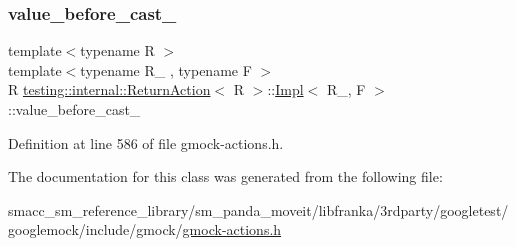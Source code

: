 \subsubsection{\texorpdfstring{value\+\_\+before\+\_\+cast\+\_\+}{value\_before\_cast\_}}
{\footnotesize\ttfamily template$<$typename R $>$ \\
template$<$typename R\+\_\+ , typename F $>$ \\
R \hyperlink{classtesting_1_1internal_1_1ReturnAction}{testing\+::internal\+::\+Return\+Action}$<$ R $>$\+::\hyperlink{classtesting_1_1internal_1_1ReturnAction_1_1Impl}{Impl}$<$ R\+\_\+, F $>$\+::value\+\_\+before\+\_\+cast\+\_\+\hspace{0.3cm}{\ttfamily [private]}}



Definition at line 586 of file gmock-\/actions.\+h.



The documentation for this class was generated from the following file\+:\begin{DoxyCompactItemize}
\item 
smacc\+\_\+sm\+\_\+reference\+\_\+library/sm\+\_\+panda\+\_\+moveit/libfranka/3rdparty/googletest/googlemock/include/gmock/\hyperlink{gmock-actions_8h}{gmock-\/actions.\+h}\end{DoxyCompactItemize}

